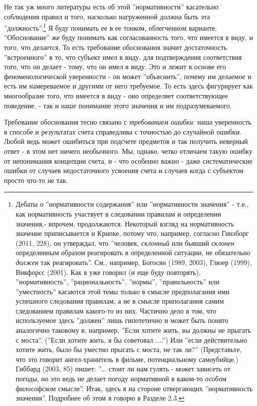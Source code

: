 \documentclass{book}
\begin{document}
Не так уж много литературы есть об этой ''нормативности'' касательно соблюдения правил и того, насколько нагруженной должна быть эта ''должность''.\footnote{Дебаты о ''нормативности содержания'' или ''нормативности значения'' - т.е., как нормативность участвует в следовании правилам и определении значения,- впрочем, продолжаются. Некоторый взгляд на нормативность значение приписывается и Крипке, потому что, например, согласно Гинзборг (2011, 228), он утверждал, что ''человек, \textit{склонный} или бывший \textit{склонен} определенным образом реагировать в определенной ситуации, не обязательно \textit{должен} так реагировать''. См., например, Богосян (1989, 2003), Глюер (1999), Викфорсс (2001). Как я уже говорил (и еще буду повторять), ''нормативность'', ''рациональность'', ''нормы'', ''правильность'' или ''уместность'' касаются этой темы только в смысле предполагания ими успешного следования правилам, а не в смысле приполагания самим следованием правилам какого-то из них. Частично дело в том, что используемое здесь ''должен'' лишь гипотетично и может быть понято аналогично таковому в, например, ''Если хотите жить, вы должны не прыгать с моста''. (''Если хотите жить, я бы советовал ....'') Или ''если действительно хотите жить, было бы уместно прыгать с моста, не так ли?'' (Представьте, что это говорит ангел-хранитель в фильме, потенциальному самоубийце.) Гиббард (2003, 85) пишет: ''... стоит ли нам гулять - может зависеть от погоды, но это ведь не делает погоду нормативной в каком-то особом философском смысле''. Итак, здесь я на стороне отвергающих ''нормативность значения''. Подробнее об этом я говорю в Разделе 2.3.} Я буду понимать ее в ее тонком, облегченном варианте. ''Обоснование'' же буду понимать как согласованность того, что имеется в виду, и того, что делается. То есть требование обоснования значит достаточность ''встроенного'' в то, что субъект имел в виду, для подтверждения соответствия того, что он делает - тому, что он имел в виду. Это и лежит в основе его феноменологической уверенности - он может ''объяснить'', почему им делаемое и есть им намереваемое и другими от него требуемое. То есть здесь фигурирует как многообразие того, что имеется в виду - оно определяет соответствующее поведение, - так и наше понимание этого значения и им подразумеваемого.

Требование обоснования тесно связано с \textit{требованием ошибки}: наша уверенность в способе и результатах счета справедлива с точностью до случайной ошибки. Любой ведь может ошибиться при подсчете предметов и так получить неверный ответ - в этом нет ничего необычного. Мы, однако, четко отличаем такую ошибку от непонимания концепции счета, и - что особенно важно - даже систематические ошибки от случаев недостаточного усвоения счета и случаев когда с субъектом просто что-то не так.
\end{document}
